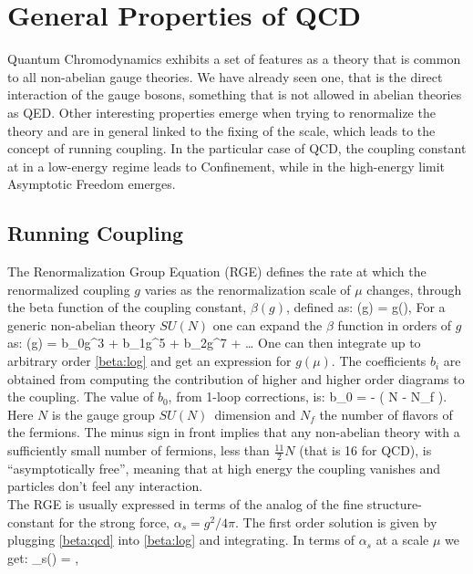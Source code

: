 \section{General Properties of QCD}
Quantum Chromodynamics exhibits a set of features as a theory that is common to all non-abelian gauge theories. We have already seen one, that is the direct interaction of the gauge bosons, something that is not allowed in abelian theories as QED. Other interesting properties emerge when trying to renormalize the theory and are in general linked to the fixing of the scale, which leads to the concept of running coupling. In the particular case of QCD, the coupling constant at in a low-energy regime leads to Confinement, while in the high-energy limit Asymptotic Freedom emerges. 

\subsection{Running Coupling} 
\label{sec:running_coupling}
The Renormalization Group Equation (RGE) defines the rate at which the renormalized coupling $g$ varies as the renormalization scale of  $\mu$ changes, through the beta function of the coupling constant, $\beta(g)$, defined as:
\beq
    \beta(g) = g(\mu),
    \label{beta:log}
\eeq 
For a generic non-abelian theory $SU(N)$ one can expand the $\beta$ function in orders of $g$ as:
\beq
    \beta(g) = b_0g^3 + b_1g^5 + b_2g^7 + \dots   
\eeq
One can then integrate up to arbitrary order \cref{beta:log} and get an expression for $g(\mu)$. The coefficients $b_i$ are obtained from computing the contribution of higher and higher order diagrams to the coupling. The value of $b_0$, from 1-loop corrections, is:
\beq 
    b_0 = -  \left( N - N_f \right).
    \label{beta:qcd}
\eeq
Here $N$ is the gauge group $SU(N)$ dimension and $N_f$ the number of flavors of the fermions. The minus sign in front implies that any non-abelian theory with a sufficiently small number of fermions, less than $\frac{11}{2}N$ (that is 16 for QCD),  is ``asymptotically free'', meaning that at high energy the coupling vanishes and particles don't feel any interaction.\\
The RGE is usually expressed in terms of the analog of the fine structure-constant for the strong force, $\alpha_s = g^2/4\pi$. The first order solution is given by plugging \cref{beta:qcd} into \cref{beta:log} and integrating. In terms of $\alpha_s$ at a scale $\mu$ we get: 
\beq
    \alpha_s(\mu) = ,
